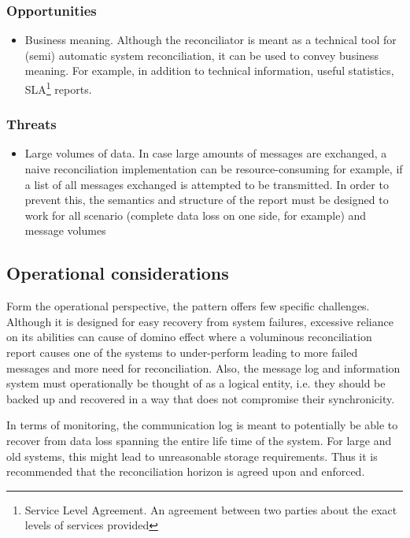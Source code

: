 \documentclass[10pt,a4paper]{article}
\begin{document}
\subsubsection{Opportunities}	
	 	\begin{itemize}
			\item Business meaning. Although the reconciliator is meant as a technical tool for (semi) automatic system reconciliation, it can be used to convey business meaning. For example, in addition to technical information, useful statistics, SLA\footnote{Service Level Agreement. An agreement between two parties about the exact levels of services provided} reports. 
		\end{itemize}
\subsubsection{Threats}	
	 	\begin{itemize}
			\item Large volumes of data. In case large amounts of messages are exchanged, a naive reconciliation implementation can be resource-consuming for example, if a list of all messages exchanged is attempted to be transmitted. In order to prevent this, the semantics and structure of the report must be designed to work for all scenario (complete data loss on one side, for example) and message volumes
		\end{itemize}

\subsection{Operational considerations}
Form the operational perspective, the pattern offers few specific challenges. Although it is designed for easy recovery from system failures, excessive reliance on its abilities can cause of domino effect where a voluminous reconciliation report causes one of the systems to under-perform leading to more failed messages and more need for reconciliation. Also, the message log and information system must operationally be thought of as a logical entity, i.e. they should be backed up and recovered in a way that does not compromise their synchronicity. 

In terms of monitoring, the communication log is meant to potentially be able to recover from data loss spanning the entire life time of the system. For large and old systems, this might lead to unreasonable storage requirements. Thus it is recommended that the reconciliation horizon is agreed upon and enforced. 


\clearpage


 
\end{document}
